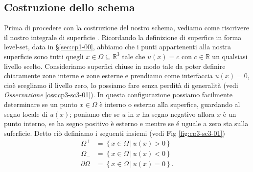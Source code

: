 \subsection{Costruzione dello schema}
\label{subsec:cp3-sc3-3-1} 
Prima di procedere con la costruzione del nostro schema, vediamo come
riscrivere il nostro integrale di  superficie
\cite[vedi][§1.5]{osher:fed}. Ricordando la definizione di superfice
in forma level-set, data in §\ref{sec:cp1-00}, abbiamo che i punti
appartenenti alla nostra superficie sono tutti quegli
$x\in\Omega\subseteq\mathbb{R}^3$ tale che $u(x)=c$ con
$c\in\mathbb{R}$ un qualsiasi livello scelto. Consideriamo superfici
chiuse in modo tale da poter definire chiaramente zone interne e zone
esterne e prendiamo come interfaccia $u(x)=0$, cioè scegliamo il
livello zero, lo possiamo fare senza perdità di generalità (vedi
\emph{Osservazione} \ref{oss:cp3-sc3-01}). In questa configurazione
possiamo facilmente  determinare se un punto $x\in\Omega$ è interno o
esterno alla superfice, guardando  al segno locale di $u(x)$; poniamo
che se $u$ in $x$ ha segno negativo allora $x$ è un punto interno, se
ha segno positivo è esterno e mentre se é uguale a zero sta sulla
suferficie. Detto ciò definiamo i seguenti insiemi (vedi Fig \ref{fig:cp3-sc3-01})
\[
\begin{aligned}
\Omega^{+}&=\left\{x\in\Omega \,|\, u(x)>0\right\} \\
\Omega_{-}&=\left\{x\in\Omega \,|\, u(x)<0\right\} \\
 \partial\Omega&=\left\{x\in\Omega \,|\, u(x)=0\right\}.
\end{aligned}
\]  
